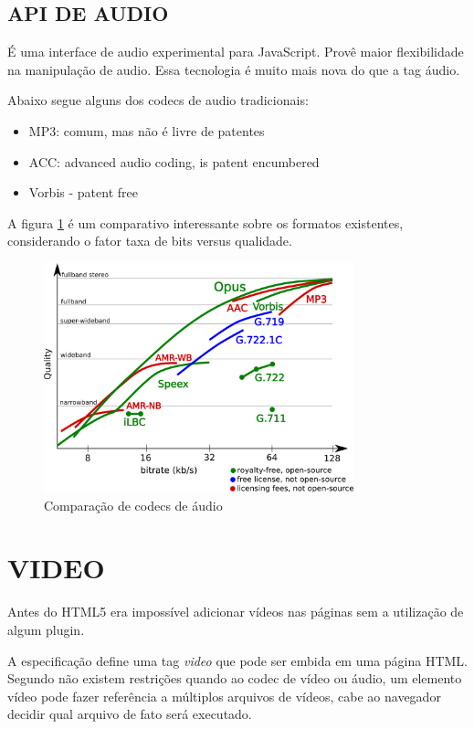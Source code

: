 \documentclass[
12pt,
a4paper,
portuges,
draft
]{report}
\begin{document}
\subsection{API DE AUDIO}

É uma interface de audio experimental para JavaScript. Provê maior
flexibilidade na manipulação de audio. Essa tecnologia é muito mais
nova do que a tag áudio.


Abaixo segue alguns dos codecs de audio tradicionais:
\begin{itemize}
    \item{MP3: comum, mas não é livre de patentes}
    \item{ACC: advanced audio coding, is patent encumbered} \item{Vorbis - patent free}
\end{itemize}

A figura \ref{fig:audioCodecs} é um comparativo interessante sobre os formatos existentes, considerando o fator taxa de bits versus qualidade.

\begin{figure}
    \centering
    \includegraphics[width=0.8\textwidth,natwidth=610,natheight=642]{codec.png}
	\caption{Comparação de codecs de áudio}
    \label{fig:audioCodecs}
\end{figure}



\section{VIDEO}
Antes do HTML5 era impossível adicionar vídeos nas páginas sem a utilização de algum plugin.

A especificação define uma tag \textit{video} que pode ser embida em uma página HTML. Segundo \cite{diveIntohtml} não existem restrições quando ao codec de vídeo ou áudio, um elemento vídeo pode fazer referência a múltiplos arquivos de vídeos, cabe ao navegador decidir qual arquivo de fato será executado.
\end{document}
